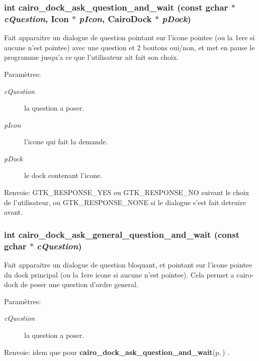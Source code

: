 \subsubsection{\setlength{\rightskip}{0pt plus 5cm}int cairo\_\-dock\_\-ask\_\-question\_\-and\_\-wait (const gchar $\ast$ {\em c\-Question}, {\bf Icon} $\ast$ {\em p\-Icon}, {\bf Cairo\-Dock} $\ast$ {\em p\-Dock})}\label{cairo-dock-dialogs_8c_9ad085be1353b2c9e30be95cba832846}


Fait apparaitre un dialogue de question pointant sur l'icone pointee (ou la 1ere si aucune n'est pointee) avec une question et 2 boutons oui/non, et met en pause le programme jusqu'a ce que l'utilisateur ait fait son choix. \begin{Desc}
\item[Param\`{e}tres:]
\begin{description}
\item[{\em c\-Question}]la question a poser. \item[{\em p\-Icon}]l'icone qui fait la demande. \item[{\em p\-Dock}]le dock contenant l'icone. \end{description}
\end{Desc}
\begin{Desc}
\item[Renvoie:]GTK\_\-RESPONSE\_\-YES ou GTK\_\-RESPONSE\_\-NO suivant le choix de l'utilisateur, ou GTK\_\-RESPONSE\_\-NONE si le dialogue s'est fait detruire avant. \end{Desc}
\subsubsection{\setlength{\rightskip}{0pt plus 5cm}int cairo\_\-dock\_\-ask\_\-general\_\-question\_\-and\_\-wait (const gchar $\ast$ {\em c\-Question})}\label{cairo-dock-dialogs_8c_d11e25360e626bff842a69d84d58037b}


Fait apparaitre un dialogue de question bloquant, et pointant sur l'icone pointee du dock principal (ou la 1ere icone si aucune n'est pointee). Cela permet a cairo-dock de poser une question d'ordre general. \begin{Desc}
\item[Param\`{e}tres:]
\begin{description}
\item[{\em c\-Question}]la question a poser. \end{description}
\end{Desc}
\begin{Desc}
\item[Renvoie:]idem que pour {\bf cairo\_\-dock\_\-ask\_\-question\_\-and\_\-wait}{\rm (p.\,\pageref{cairo-dock-dialogs_8h_9ad085be1353b2c9e30be95cba832846})} . \end{Desc}



